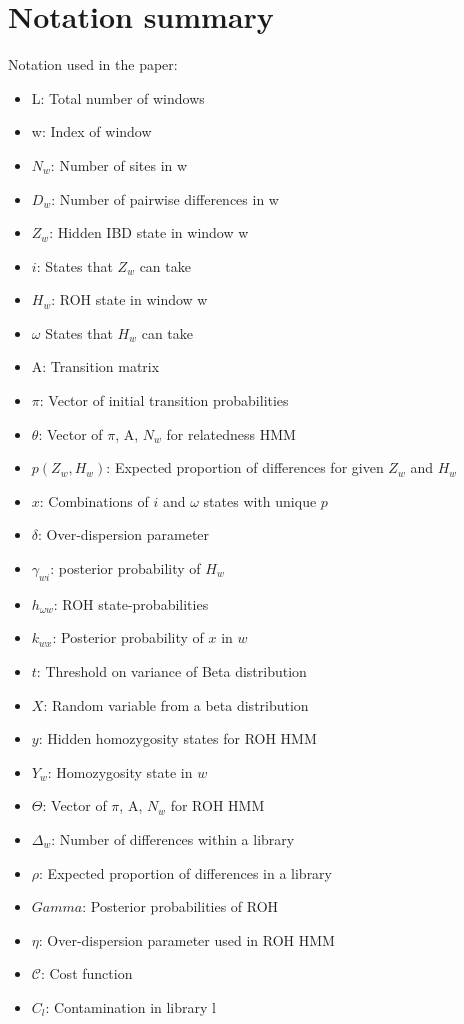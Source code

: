 \documentclass[12pt, letterpaper]{article}
\begin{document}





\section{Notation summary}
Notation used in the paper:

\begin{itemize}
\item L: Total number of windows
\item w: Index of window
\item $N_w$: Number of sites in w
\item $D_{w}$: Number of pairwise differences in w
\item $Z_w$: Hidden IBD state in window w
\item $i$: States that $Z_w$ can take 
\item $H_w$: ROH state in window w
\item $\omega$ States that $H_w$ can take
\item A: Transition matrix
\item $\pi$: Vector of initial transition probabilities
\item $\theta$: Vector of $\pi$, A, $N_w$ for relatedness HMM
\item $p(Z_w,H_w)$: Expected proportion of differences for given $Z_w$ and $H_w$
\item $x$: Combinations of $i$ and $\omega$ states with unique $p$
\item $\delta$: Over-dispersion parameter
\item $\gamma_{wi}$: posterior probability of $H_w$
\item $h_{\omega w}$: ROH state-probabilities
\item $k_{wx}$: Posterior probability of $x$ in $w$
\item $t$: Threshold on variance of Beta distribution
\item $X$: Random variable from a beta distribution
\item $y$: Hidden homozygosity states for ROH HMM
\item $Y_w$: Homozygosity state in $w$
\item $\Theta$: Vector of $\pi$, A, $N_w$ for ROH HMM
\item $\Delta_w$: Number of differences within a library 
\item $\rho$: Expected proportion of differences in a library
\item $Gamma$: Posterior probabilities of ROH
\item $\eta$: Over-dispersion parameter used in ROH HMM
\item $\mathcal{C}$: Cost function
\item $C_l$: Contamination in library l


\end{itemize}
\end{document}
